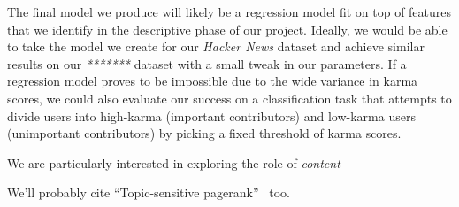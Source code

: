 \documentclass[11pt]{article}
\newcommand{\titlecite}[2]{``#1''~\cite{#2}}
\begin{document}
The final model we produce will likely be a regression model fit on top of features that
we identify in the descriptive phase of our project. Ideally, we would be able to take
the model we create for our \textit{Hacker News} dataset and achieve similar results on
our \textit{*******} dataset with a small tweak in our parameters. If a regression model
proves to be impossible due to the wide variance in karma scores, we could also evaluate
our success on a classification task that attempts to divide users into high-karma (important
contributors) and low-karma users (unimportant contributors) by picking a fixed threshold of
karma scores.

We are particularly interested in exploring the role of \textit{content}




We'll probably cite \titlecite{Topic-sensitive pagerank}{haveliwala2002topic} too. 

{} 
\end{document}
